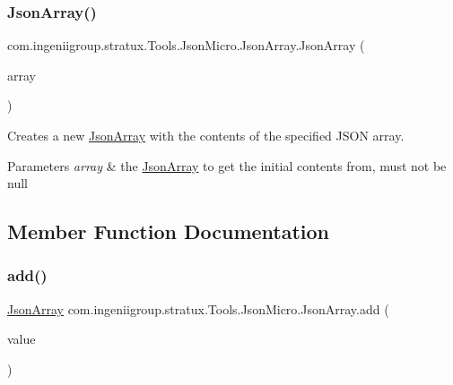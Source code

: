 \subsubsection{\texorpdfstring{Json\+Array()}{JsonArray()}\hspace{0.1cm}{\footnotesize\ttfamily [2/2]}}
{\footnotesize\ttfamily com.\+ingeniigroup.\+stratux.\+Tools.\+Json\+Micro.\+Json\+Array.\+Json\+Array (\begin{DoxyParamCaption}\item[{\hyperlink{classcom_1_1ingeniigroup_1_1stratux_1_1_tools_1_1_json_micro_1_1_json_array}{Json\+Array}}]{array }\end{DoxyParamCaption})}

Creates a new \hyperlink{classcom_1_1ingeniigroup_1_1stratux_1_1_tools_1_1_json_micro_1_1_json_array}{Json\+Array} with the contents of the specified J\+S\+ON array.


\begin{DoxyParams}{Parameters}
{\em array} & the \hyperlink{classcom_1_1ingeniigroup_1_1stratux_1_1_tools_1_1_json_micro_1_1_json_array}{Json\+Array} to get the initial contents from, must not be {\ttfamily null} \\
\hline
\end{DoxyParams}


\subsection{Member Function Documentation}
\mbox{\label{classcom_1_1ingeniigroup_1_1stratux_1_1_tools_1_1_json_micro_1_1_json_array_a2051c94164b197cfecaae36d48c030a1}} 
\subsubsection{\texorpdfstring{add()}{add()}\hspace{0.1cm}{\footnotesize\ttfamily [1/7]}}
{\footnotesize\ttfamily \hyperlink{classcom_1_1ingeniigroup_1_1stratux_1_1_tools_1_1_json_micro_1_1_json_array}{Json\+Array} com.\+ingeniigroup.\+stratux.\+Tools.\+Json\+Micro.\+Json\+Array.\+add (\begin{DoxyParamCaption}\item[{int}]{value }\end{DoxyParamCaption})}


